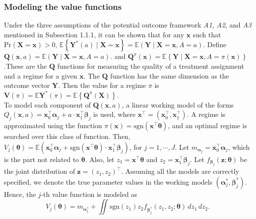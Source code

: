\documentclass{article}
\newcommand{\itl}{\intercal}
\newcommand{\bs}{ \boldsymbol}
\newcommand{\mb}{\mathbb}
\newcommand{\txt}{\text}
\newcommand{\lt}{\left}
\newcommand{\rt}{\right}
\newcommand{\tsgn}{\txt{sgn}}
\begin{document}
\subsubsection{Modeling the value functions}
 Under the three assumptions of the potential outcome framework \textit{A1, A2}, and \textit{A3} mentioned in Subsection 1.1.1, it can be shown that for any $\bs{x}$ such that $\text{Pr}(\bs{X}=\bs{x})>0$, $\mathbb{E}\lt\{ \bs{Y}^{*}(a)\mid\bs{X}=\bs{x}\rt\} =\mathbb{E}\lt(\bs{Y}\mid\bs{X}=\bs{x},A=a\rt)$. Define $\bs{Q}(\bs{x},a)=\mathbb{E}\lt(\bs{Y}\mid\bs{X}=\bs{x},A=a\rt)$. and $\bs{Q}^{\pi}(\bs{x})=\mathbb{E}\lt\{\bs{Y}\mid\bs{X}=\bs{x},A=\pi(\bs{x})\rt\}$.These are the $\bs{Q}$ functions for measuring the quality of a treatment assignment and a regime for a given $\bs{x}$. The $\bs{Q}$ function has the same dimension as the outcome vector $\bs{Y}$. Then the value for a regime $\pi$ is $\bs{V}(\pi) = \mb{E} {\bs{Y}^{*}\lt(\pi\rt)} = \mb{E}\lt\{ \bs{Q}^{\pi}\lt(\bs{X}\rt)\rt\}$. \\

To model each component of $\bs{Q}\lt(\bs{x}, a\rt)$, a linear working model of the forms $Q_{j}\lt(\bs{x},a\rt)=\bs{x}_{0}^{\itl}\bs{\alpha}_{j}+a\cdot\bs{x}_{1}^{\itl}\bs{\beta}_{j}$ is used, where $\bs{x}^{\itl}=\lt(\bs{x}_{0}^{\itl},\bs{x}_{1}^{\itl}\rt)$. A regime is approximated using the function $\pi(\bs{x}) = \tsgn(\bs{x}^{\itl}\bs{\theta})$, and an optimal regime is searched over this class of function. Then, $V_j(\bs{\theta}) = \mb{E}\lt(\bs{x}_{0}^{\itl}\bs{\alpha}_{j}+\tsgn(\bs{x}^{\itl}\bs{\theta})\cdot\bs{x}_{1}^{\itl}\bs{\beta}_{j}\rt)$, for $j = 1, \cdots, J$. Let $m_{\bs{\alpha}_j} = \bs{x}^{\itl}_0 \bs{\alpha}_j$, which is the part not related to $\bs{\theta}$. Also, let $z_1 = \bs{x}^{\itl}\bs{\theta}$ and $z_2 = \bs{x}_{1}^{\itl}\bs{\beta}_{j}$. Let $f_{\bs{\beta}_j}\lt(\bs{z}; \bs{\theta}\rt)$ be the joint distribution of $\bs{z} = (z_1, z_2)^{\itl}$. Assuming all the models are correctly specified, we denote the true parameter values in the working models $\lt( \bs{\alpha}_{j}^{*}, \bs{\beta}_{j}^{*} \rt)$. Hence, the $j$-th value function is modeled as $$V_j\lt(\bs{\theta}\rt) = m_{\bs{\alpha}^*_j}+ \iint \tsgn\lt(z_1\rt)z_2 f_{\bs{\beta}^*_j}\lt(z_1, z_2; \bs{\theta}\rt) \,dz_1 \,dz_2.$$ 
\end{document}
